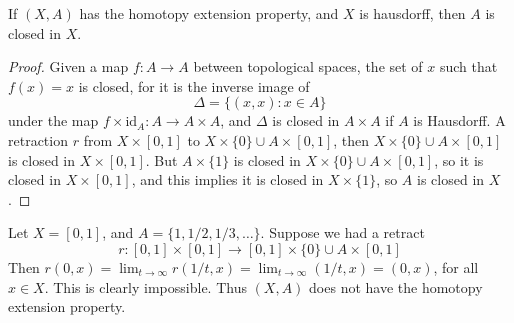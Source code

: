 \begin{theorem}
    If $(X,A)$ has the homotopy extension property, and $X$ is hausdorff, then $A$ is closed in $X$.
\end{theorem}
\begin{proof}
    Given a map $f: A \to A$ between topological spaces, the set of $x$ such that $f(x) = x$ is closed, for it is the inverse image of
    \[ \Delta = \{ (x,x) : x \in A \} \]
    under the map $f \times \text{id}_A: A \to A \times A$, and $\Delta$ is closed in $A \times A$ if $A$ is Hausdorff. A retraction $r$ from $X \times [0,1]$ to $X \times \{ 0 \} \cup A \times [0,1]$, then $X \times \{ 0 \} \cup A \times [0,1]$ is closed in $X \times [0,1]$. But $A \times \{ 1 \}$ is closed in $X \times \{ 0 \} \cup A \times [0,1]$, so it is closed in $X \times [0,1]$, and this implies it is closed in $X \times \{ 1 \}$, so $A$ is closed in $X$.
\end{proof}

\begin{example}
    Let $X = [0,1]$, and $A = \{ 1, 1/2, 1/3, \dots \}$. Suppose we had a retract
    \[ r: [0,1] \times [0,1] \to [0,1] \times \{ 0 \} \cup A \times [0,1] \]
    Then $r(0,x) = \lim_{t \to \infty} r(1/t, x) = \lim_{t \to \infty} (1/t,x) = (0,x)$, for all $x \in X$. This is clearly impossible. Thus $(X,A)$ does not have the homotopy extension property.
\end{example}

